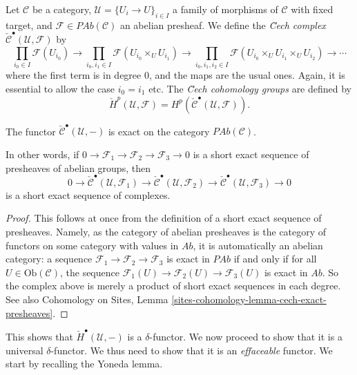 \begin{definition}
\label{definition-cech-complex}
Let $\mathcal{C}$ be a category,
$\mathcal{U} = \{U_i \to U\}_{i \in I}$ a family of morphisms of $\mathcal{C}$
with fixed target, and $\mathcal{F} \in \textit{PAb}(\mathcal{C})$ an abelian
presheaf. We define the {\it \u Cech complex}
$\check{\mathcal{C}}^\bullet(\mathcal{U}, \mathcal{F})$ by
$$
\prod_{i_0\in I} \mathcal{F}(U_{i_0}) \to
\prod_{i_0, i_1\in I} \mathcal{F}(U_{i_0}\times_U U_{i_1}) \to
\prod_{i_0, i_1, i_2 \in I}
\mathcal{F}(U_{i_0}\times_U U_{i_1} \times_U U_{i_2}) \to \cdots
$$
where the first term is in degree 0, and the maps are the usual ones. Again, it
is essential to allow the case $i_0 = i_1$ etc. The
{\it \u Cech cohomology groups} are defined by
$$
\check{H}^p(\mathcal{U}, \mathcal{F}) =
H^p(\check{\mathcal{C}}^\bullet(\mathcal{U}, \mathcal{F})).
$$
\end{definition}

\begin{lemma}
\label{lemma-cech-presheaves}
The functor $\check{\mathcal{C}}^\bullet(\mathcal{U}, -)$
is exact on the category $\textit{PAb}(\mathcal{C})$.
\end{lemma}	

\noindent
In other words, if $0\to \mathcal{F}_1\to \mathcal{F}_2\to \mathcal{F}_3\to 0$
is a short exact sequence of presheaves of abelian groups, then
$$
0 \to \check{\mathcal{C}}^\bullet\left(\mathcal{U}, \mathcal{F}_1\right)
\to\check{\mathcal{C}}^\bullet(\mathcal{U}, \mathcal{F}_2) \to
\check{\mathcal{C}}^\bullet(\mathcal{U}, \mathcal{F}_3)\to 0
$$
is a short exact sequence of complexes.

\begin{proof}
This follows at once from the definition of a short exact sequence of
presheaves. Namely, as the category of abelian presheaves is the category of
functors on some category with values in $\textit{Ab}$, it is automatically an
abelian category: a sequence $\mathcal{F}_1\to \mathcal{F}_2\to \mathcal{F}_3$
is exact in $\textit{PAb}$ if and only if for all
$U \in \text{Ob}(\mathcal{C})$, the sequence
$\mathcal{F}_1(U) \to \mathcal{F}_2(U) \to \mathcal{F}_3(U)$ is exact in
$\textit{Ab}$. So the complex above is merely a product of short exact
sequences in each degree. See also
Cohomology on Sites, Lemma \ref{sites-cohomology-lemma-cech-exact-presheaves}.
\end{proof}

\noindent
This shows that $\check{H}^\bullet(\mathcal{U}, -)$ is a $\delta$-functor.
We now proceed to show that it is a universal $\delta$-functor. We thus need to
show that it is an {\it effaceable} functor. We start by recalling the Yoneda
lemma.

